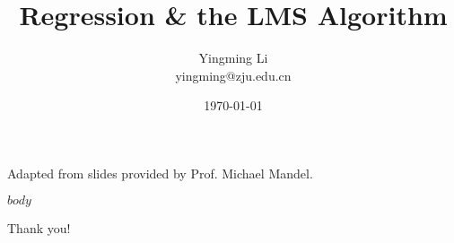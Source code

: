 \documentclass[notes]{beamer}
\title[Opt for ML]{Regression \& the LMS Algorithm}
\author[YingmingLi]{Yingming Li \\ yingming@zju.edu.cn}
\institute[DSERC, ZJU]{Data Science \& Engineering Research Center, ZJU}
\date[\today]{\today}
\newcommand{\chuhao}{\fontsize{44.9pt}{\baselineskip}\selectfont}
\begin{document}



\begin{frame}
	\titlepage
	\begin{center}
		Adapted from slides provided by Prof.  Michael Mandel.		
	\end{center}

\end{frame}

$body$

\begin{frame}
	\chuhao Thank you! %
\end{frame}
\end{document}
